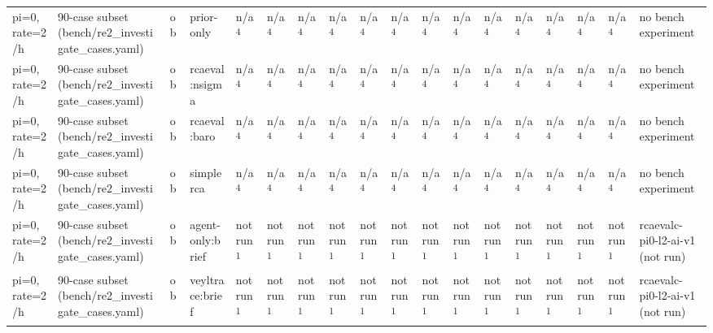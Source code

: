 \begin{table}[t]
\begin{tabular}{llllllllllllllllll}
pi=0, rate=2/h & 90-case subset (bench/re2\_investigate\_cases.yaml) & ob & prior-only & n/a\textsuperscript{4} & n/a\textsuperscript{4} & n/a\textsuperscript{4} & n/a\textsuperscript{4} & n/a\textsuperscript{4} & n/a\textsuperscript{4} & n/a\textsuperscript{4} & n/a\textsuperscript{4} & n/a\textsuperscript{4} & n/a\textsuperscript{4} & n/a\textsuperscript{4} & n/a\textsuperscript{4} & n/a\textsuperscript{4} & no bench experiment \\
pi=0, rate=2/h & 90-case subset (bench/re2\_investigate\_cases.yaml) & ob & rcaeval:nsigma & n/a\textsuperscript{4} & n/a\textsuperscript{4} & n/a\textsuperscript{4} & n/a\textsuperscript{4} & n/a\textsuperscript{4} & n/a\textsuperscript{4} & n/a\textsuperscript{4} & n/a\textsuperscript{4} & n/a\textsuperscript{4} & n/a\textsuperscript{4} & n/a\textsuperscript{4} & n/a\textsuperscript{4} & n/a\textsuperscript{4} & no bench experiment \\
pi=0, rate=2/h & 90-case subset (bench/re2\_investigate\_cases.yaml) & ob & rcaeval:baro & n/a\textsuperscript{4} & n/a\textsuperscript{4} & n/a\textsuperscript{4} & n/a\textsuperscript{4} & n/a\textsuperscript{4} & n/a\textsuperscript{4} & n/a\textsuperscript{4} & n/a\textsuperscript{4} & n/a\textsuperscript{4} & n/a\textsuperscript{4} & n/a\textsuperscript{4} & n/a\textsuperscript{4} & n/a\textsuperscript{4} & no bench experiment \\
pi=0, rate=2/h & 90-case subset (bench/re2\_investigate\_cases.yaml) & ob & simplerca & n/a\textsuperscript{4} & n/a\textsuperscript{4} & n/a\textsuperscript{4} & n/a\textsuperscript{4} & n/a\textsuperscript{4} & n/a\textsuperscript{4} & n/a\textsuperscript{4} & n/a\textsuperscript{4} & n/a\textsuperscript{4} & n/a\textsuperscript{4} & n/a\textsuperscript{4} & n/a\textsuperscript{4} & n/a\textsuperscript{4} & no bench experiment \\
pi=0, rate=2/h & 90-case subset (bench/re2\_investigate\_cases.yaml) & ob & agent-only:brief & not run\textsuperscript{1} & not run\textsuperscript{1} & not run\textsuperscript{1} & not run\textsuperscript{1} & not run\textsuperscript{1} & not run\textsuperscript{1} & not run\textsuperscript{1} & not run\textsuperscript{1} & not run\textsuperscript{1} & not run\textsuperscript{1} & not run\textsuperscript{1} & not run\textsuperscript{1} & not run\textsuperscript{1} & rcaevalc-pi0-l2-ai-v1 (not run) \\
pi=0, rate=2/h & 90-case subset (bench/re2\_investigate\_cases.yaml) & ob & veyltrace:brief & not run\textsuperscript{1} & not run\textsuperscript{1} & not run\textsuperscript{1} & not run\textsuperscript{1} & not run\textsuperscript{1} & not run\textsuperscript{1} & not run\textsuperscript{1} & not run\textsuperscript{1} & not run\textsuperscript{1} & not run\textsuperscript{1} & not run\textsuperscript{1} & not run\textsuperscript{1} & not run\textsuperscript{1} & rcaevalc-pi0-l2-ai-v1 (not run) \\

\end{tabular}
\end{table}
